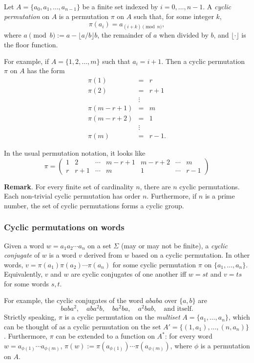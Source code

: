 \documentclass[12pt]{article}
\begin{document}
Let $A=\lbrace a_0,a_1,\ldots, a_{n-1}\rbrace$ be a finite set indexed by $i=0,\ldots, n-1$.  A \emph{cyclic permutation} on $A$ is a permutation $\pi$ on $A$ such that, for some integer $k$, $$\pi(a_i)=a_{(i+k)\!\!\!\!\!\! \pmod n},$$
where $a\!\!\pmod b:= a - \lfloor a/b \rfloor b$, the remainder of $a$ when divided by $b$, and $\lfloor \cdot \rfloor$ is the floor function.

For example, if $A=\lbrace 1,2,\ldots,m\rbrace$ such that $a_i=i+1$.  Then a cyclic permutation $\pi$ on $A$ has the form
\begin{eqnarray*}
\pi(1) &=& r \\
\pi(2) &=& r+1 \\
&\vdots & \\
\pi(m-r+1) &=& m \\
\pi(m-r+2) &=& 1 \\
&\vdots & \\
\pi(m) &=& r-1.
\end{eqnarray*}

In the usual permutation notation, it looks like 
$$\pi=\left( \begin{array}{ccccccc}
1 & 2 & \cdots & m-r+1 & m-r+2 & \cdots & m \\
r & r+1 & \cdots & m & 1 & \cdots & r-1 \end{array} \right)$$

\textbf{Remark}.  For every finite set of cardinality $n$, there are $n$ cyclic permutations.  Each non-trivial cyclic permutation has order $n$.  Furthermore, if $n$ is a prime number, the set of cyclic permutations forms a cyclic group.

\subsubsection*{Cyclic permutations on words}

Given a word $w=a_1a_2\cdots a_n$ on a set $\Sigma$ (may or may not be finite), a \emph{cyclic conjugate} of $w$ is a word $v$ derived from $w$ based on a cyclic permutation.  In other words, $v=\pi(a_1)\pi(a_2)\cdots \pi(a_n)$ for some cyclic permutation $\pi$ on $\lbrace a_1,\ldots, a_n\rbrace$.  Equivalently, $v$ and $w$ are cyclic conjugates of one another iff $w=st$ and $v=ts$ for some words $s,t$.

For example, the cyclic conjugates of the word $ababa$ over $\lbrace a,b\rbrace$ are $$baba^2,\quad aba^2b,\quad ba^2ba,\quad a^2bab,\quad\mbox{and itself}.$$
Strictly speaking, $\pi$ is a cyclic permutation on the \emph{multiset} $A=\lbrace a_1,\ldots, a_n\rbrace$, which can be thought of as a cyclic permutation on the set $A'=\lbrace (1,a_1),\ldots, (n,a_n)\rbrace$.  Furthermore, $\pi$ can be extended to a function on $A^*$: for every word $w=a_{\phi(1)}\cdots a_{\phi(m)}$, $\pi(w):=\pi(a_{\phi(1)})\cdots \pi(a_{\phi(m)})$, where $\phi$ is a permutation on $A$.
\end{document}
